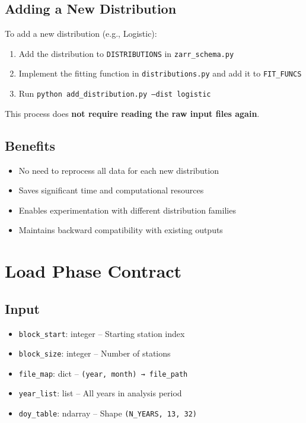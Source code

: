 ﻿\documentclass[12pt,a4paper]{report}
\begin{document}
\subsection{Adding a New Distribution}
To add a new distribution (e.g., Logistic):
\begin{enumerate}
    \item Add the distribution to \texttt{DISTRIBUTIONS} in \texttt{zarr\_schema.py}
    \item Implement the fitting function in \texttt{distributions.py} and add it to \texttt{FIT\_FUNCS}
    \item Run \texttt{python add\_distribution.py --dist logistic}
\end{enumerate}
This process does \textbf{not require reading the raw input files again}.

\subsection{Benefits}
\begin{itemize}
    \item No need to reprocess all data for each new distribution
    \item Saves significant time and computational resources
    \item Enables experimentation with different distribution families
    \item Maintains backward compatibility with existing outputs
\end{itemize}


\section{Load Phase Contract}
\subsection{Input}
\begin{itemize}[leftmargin=*]
    \item \texttt{block\_start}: integer – Starting station index
    \item \texttt{block\_size}: integer – Number of stations
    \item \texttt{file\_map}: dict – \texttt{(year, month) → file\_path}
    \item \texttt{year\_list}: list – All years in analysis period
    \item \texttt{doy\_table}: ndarray – Shape \texttt{(N\_YEARS, 13, 32)}
\end{itemize}
\end{document}
